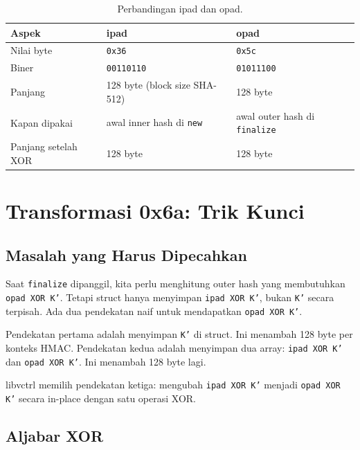 \documentclass[11pt,a4paper]{article}
\begin{document}
\begin{table}[H]
	\centering
	\caption{Perbandingan ipad dan opad.}
	\label{tab:ipad-opad}
	\small
	\begin{tabularx}{\textwidth}{l l X}
		\toprule
		Aspek               & ipad                            & opad                                 \\
		\midrule
		Nilai byte          & \texttt{0x36}                   & \texttt{0x5c}                        \\
		Biner               & \texttt{00110110}               & \texttt{01011100}                    \\
		Panjang             & 128 byte (block size SHA-512)   & 128 byte                             \\
		Kapan dipakai       & awal inner hash di \texttt{new} & awal outer hash di \texttt{finalize} \\
		Panjang setelah XOR & 128 byte                        & 128 byte                             \\
		\bottomrule
	\end{tabularx}
\end{table}

\section{Transformasi 0x6a: Trik Kunci}

\subsection{Masalah yang Harus Dipecahkan}

Saat \texttt{finalize} dipanggil, kita perlu menghitung outer hash yang membutuhkan \texttt{opad XOR K'}. Tetapi struct hanya menyimpan \texttt{ipad XOR K'}, bukan \texttt{K'} secara terpisah. Ada dua pendekatan naif untuk mendapatkan \texttt{opad XOR K'}.

Pendekatan pertama adalah menyimpan \texttt{K'} di struct. Ini menambah 128 byte per konteks HMAC. Pendekatan kedua adalah menyimpan dua array: \texttt{ipad XOR K'} dan \texttt{opad XOR K'}. Ini menambah 128 byte lagi.

libvctrl memilih pendekatan ketiga: mengubah \texttt{ipad XOR K'} menjadi \texttt{opad XOR K'} secara in-place dengan satu operasi XOR.

\subsection{Aljabar XOR}
\end{document}
